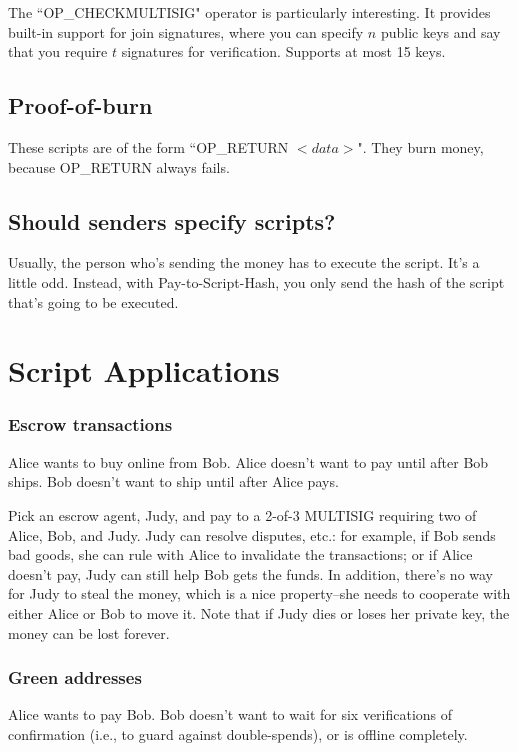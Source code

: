 \documentclass[12pt]{article}
\begin{document}
The ``OP\_CHECKMULTISIG" operator is particularly interesting. It provides built-in support for join signatures, where you can specify $n$ public keys and say that you require $t$ signatures for verification. Supports at most 15 keys.

\subsection*{Proof-of-burn}

These scripts are of the form ``OP\_RETURN $<data>$". They burn money, because OP\_RETURN always fails.

\subsection*{Should senders specify scripts?}

Usually, the person who's sending the money has to execute the script. It's a little odd. Instead, with Pay-to-Script-Hash, you only send the hash of the script that's going to be executed.

\section*{Script Applications}

\subsubsection*{Escrow transactions}

Alice wants to buy online from Bob. Alice doesn't want to pay until after Bob ships. Bob doesn't want to ship until after Alice pays.

Pick an escrow agent, Judy, and pay to a 2-of-3 MULTISIG requiring two of Alice, Bob, and Judy. Judy can resolve disputes, etc.: for example, if Bob sends bad goods, she can rule with Alice to invalidate the transactions; or if Alice doesn't pay, Judy can still help Bob gets the funds. In addition, there's no way for Judy to steal the money, which is a nice property--she needs to cooperate with either Alice or Bob to move it. Note that if Judy dies or loses her private key, the money can be lost forever.

\subsubsection*{Green addresses}

Alice wants to pay Bob. Bob doesn't want to wait for six verifications of confirmation (i.e., to guard against double-spends), or is offline completely.
\end{document}
